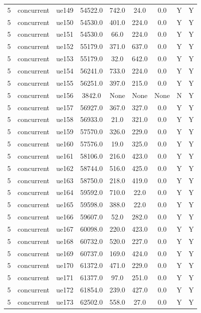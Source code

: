 \begin{table}[ht]
\begin{tabular}{|c|c|c|c|c|c|c|c|c|}
5 & concurrent & ue149 & 54522.0 & 742.0 & 24.0 & 0.0 & Y & Y \\
5 & concurrent & ue150 & 54530.0 & 401.0 & 224.0 & 0.0 & Y & Y \\
5 & concurrent & ue151 & 54530.0 & 66.0 & 224.0 & 0.0 & Y & Y \\
5 & concurrent & ue152 & 55179.0 & 371.0 & 637.0 & 0.0 & Y & Y \\
5 & concurrent & ue153 & 55179.0 & 32.0 & 642.0 & 0.0 & Y & Y \\
5 & concurrent & ue154 & 56241.0 & 733.0 & 224.0 & 0.0 & Y & Y \\
5 & concurrent & ue155 & 56251.0 & 397.0 & 215.0 & 0.0 & Y & Y \\
5 & concurrent & ue156 & 3842.0 & None & None & None & N & Y \\
5 & concurrent & ue157 & 56927.0 & 367.0 & 327.0 & 0.0 & Y & Y \\
5 & concurrent & ue158 & 56933.0 & 21.0 & 321.0 & 0.0 & Y & Y \\
5 & concurrent & ue159 & 57570.0 & 326.0 & 229.0 & 0.0 & Y & Y \\
5 & concurrent & ue160 & 57576.0 & 19.0 & 325.0 & 0.0 & Y & Y \\
5 & concurrent & ue161 & 58106.0 & 216.0 & 423.0 & 0.0 & Y & Y \\
5 & concurrent & ue162 & 58744.0 & 516.0 & 425.0 & 0.0 & Y & Y \\
5 & concurrent & ue163 & 58750.0 & 218.0 & 419.0 & 0.0 & Y & Y \\
5 & concurrent & ue164 & 59592.0 & 710.0 & 22.0 & 0.0 & Y & Y \\
5 & concurrent & ue165 & 59598.0 & 388.0 & 22.0 & 0.0 & Y & Y \\
5 & concurrent & ue166 & 59607.0 & 52.0 & 282.0 & 0.0 & Y & Y \\
5 & concurrent & ue167 & 60098.0 & 220.0 & 423.0 & 0.0 & Y & Y \\
5 & concurrent & ue168 & 60732.0 & 520.0 & 227.0 & 0.0 & Y & Y \\
5 & concurrent & ue169 & 60737.0 & 169.0 & 424.0 & 0.0 & Y & Y \\
5 & concurrent & ue170 & 61372.0 & 471.0 & 229.0 & 0.0 & Y & Y \\
5 & concurrent & ue171 & 61377.0 & 97.0 & 251.0 & 0.0 & Y & Y \\
5 & concurrent & ue172 & 61854.0 & 239.0 & 427.0 & 0.0 & Y & Y \\
5 & concurrent & ue173 & 62502.0 & 558.0 & 27.0 & 0.0 & Y & Y \\

\end{tabular}
\end{table}
